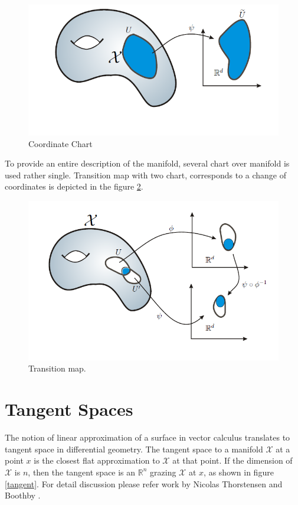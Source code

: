 \begin{figure}[ht]
\begin{center}
\includegraphics[width=\textwidth]{./Figures/chart.png}
\caption{Coordinate Chart\citep{Ety2008}}
\label{chart}
\end{center}
\end{figure}

To provide an entire description  of the manifold, several chart over manifold is used rather single. Transition map with two chart, corresponds to a change of coordinates is depicted in the figure \ref{TM}. 

\begin{figure}[ht]
\begin{center}
\includegraphics[width=\textwidth]{./Figures/TM.png}
\caption{Transition map.\citep{Ety2008}}
\label{TM}
\end{center}
\end{figure}

\section{Tangent Spaces}
The notion of linear approximation of a surface in vector calculus translates
to tangent space in differential geometry. The tangent space to a manifold $\mathcal{X}$ at a point $x$ is the closest flat approximation to $\mathcal{X}$ at that point.  If the dimension of $\mathcal{X}$ is $n$, then the tangent space is an $\mathbb{R}^n$ grazing $\mathcal{X}$ at $x$, as shown in figure \ref{tangent}. For detail discussion please refer work by Nicolas Thorstensen \citep{Thor2009} and Boothby \citep{Boot2003}.

